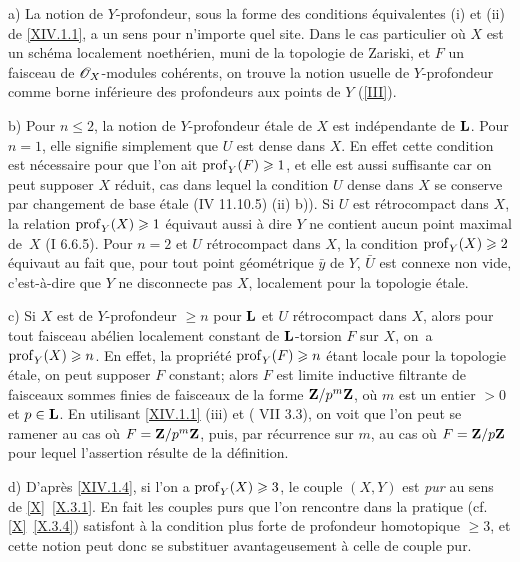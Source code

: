 \skpt
\begin{remarques} \label{XIV.1.6}
a) La notion de $Y$-profondeur, sous la forme des conditions \'equivalentes \textup{(i)} et \textup{(ii)} de \ref{XIV.1.1}, a un sens pour n'importe quel site. Dans le cas particulier o\`u $X$ est un sch\'ema localement noeth\'erien, muni de la topologie de Zariski, et $F$ un faisceau de $\mathscr{O}_X$-modules coh\'erents, on trouve la notion usuelle de $Y$-profondeur comme borne inf\'erieure des profondeurs aux points de $Y$ (\ref{III}).

b) Pour $n\leq 2$, la notion de $Y$-profondeur \'etale de $X$ est ind\'ependante de $\mathbf{L}$. Pour $n=1$, elle signifie simplement que $U$ est dense dans $X$. En effet cette condition est n\'ecessaire pour que l'on ait $\operatorname{prof}_Y(F)\geqslant 1$, et elle est aussi suffisante car on peut supposer $X$ r\'eduit, cas dans lequel la condition $U$ dense dans $X$ se conserve par changement de base \'etale \textup{(\EGA IV 11.10.5) \textup{(ii)} b))}. Si $U$ est r\'etrocompact dans $X$, la relation $\operatorname{prof}_Y(X)\geqslant 1$ \'equivaut aussi \`a dire $Y$ ne contient aucun point maximal de~$X$ (\EGA I 6.6.5). Pour $n=2$ et $U$ r\'etrocompact dans $X$, la condition $\operatorname{prof}_Y(X)\geqslant 2$ \'equivaut au fait que, pour tout point g\'eom\'etrique $\bar y$ de $Y$, $\bar U$ est connexe non vide, c'est-\`a-dire que \og $Y$ ne disconnecte pas $X$, localement pour la topologie \'etale\fg.

c) Si $X$ est de $Y$-profondeur $\geq n$ pour $\mathbf{L}$ et $U$ r\'etrocompact dans $X$, alors pour tout faisceau ab\'elien localement constant de $\mathbf{L}$-torsion $F$ sur $X$, on~a $\operatorname{prof}_Y(X)\geqslant n$. En effet, la propri\'et\'e $\operatorname{prof}_Y(F)\geqslant n$ \'etant locale pour la topologie \'etale, on peut supposer $F$ constant; alors $F$ est limite inductive filtrante de faisceaux sommes finies de faisceaux de la forme $\mathbf{Z}/p^m\mathbf{Z}$, o\`u $m$ est un entier $>0$ et $p\in \mathbf{L}$. En utilisant \ref{XIV.1.1} \textup{(iii)} et \textup{( VII 3.3)}, on voit que l'on peut se ramener au cas o\`u $F=\mathbf{Z}/p^m\mathbf{Z}$, puis, par r\'ecurrence sur $m$, au cas o\`u $F=\mathbf{Z}/p\mathbf{Z}$ pour lequel l'assertion r\'esulte de la d\'efinition.

d) D'apr\`es \ref{XIV.1.4}, si l'on a $\operatorname{prof}_Y(X)\geqslant 3$, le couple $(X, Y)$ est \textit{pur} au sens de \ref{X}~\ref{X.3.1}. En fait les couples purs que l'on rencontre dans la pratique (cf. \ref{X}~\ref{X.3.4}) satisfont \`a la condition plus forte de profondeur homotopique $\geq 3$, et cette notion peut donc se substituer avantageusement \`a celle de couple pur.


\end{remarques}
